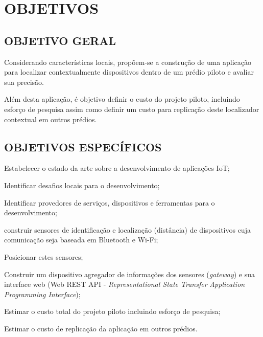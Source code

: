 
\chapter{OBJETIVOS}
\label{chap:OBJETIVOS}

\section{OBJETIVO GERAL}
\label{sec:OBJETIVO GERAL}

Considerando características locais, propõem-se a construção de uma aplicação
para localizar contextualmente dispositivos dentro de um prédio piloto e avaliar
sua precisão.

Além desta aplicação, é objetivo definir o custo do projeto piloto, incluindo
esforço de pesquisa assim como definir um custo para replicação deste
localizador contextual em outros prédios.

\section{OBJETIVOS ESPECÍFICOS}
\label{sec:OBJETIVOS ESPECÍFICOS}

\begin{alineas}

	\item Estabelecer o estado da arte sobre a desenvolvimento de aplicações IoT;

	\item Identificar desafios locais para o desenvolvimento;

	\item Identificar provedores de serviços, dispositivos e ferramentas para o
desenvolvimento;

	\item construir sensores de identificação e localização (distância) de
 dispositivos cuja comunicação seja baseada em Bluetooth e Wi-Fi;

	\item Posicionar estes sensores;

	\item Construir um dispositivo agregador de informações dos sensores
 (\textit{gateway}) e sua interface web (Web REST API - \textit{Representational
State Transfer} \textit{Application Programming Interface});

	\item Estimar o custo total do projeto piloto incluindo esforço de pesquisa;

	\item Estimar o custo de replicação da aplicação em outros prédios.

\end{alineas}